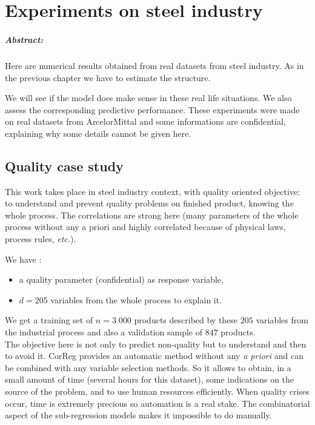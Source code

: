 \documentclass[12pt,a4paper]{report}
\begin{document}
\chapter{Experiments on steel industry} \label{sectionrealcase}
\paragraph{Abstract:} Here are numerical results obtained from real datasets from steel industry. As in the previous chapter we have to estimate the structure. 

We will see if the model does make sense in these real life situations.%
We also assess the corresponding predictive performance. 
These experiments were made on real datasets from ArcelorMittal and some informations are confidential, explaining why some details cannot be given here.%

	\section{Quality case study} \label{sectionexfos}
This work takes place in steel industry context, with quality oriented objective: to understand and prevent quality problems on finished product, knowing the whole process. The correlations are strong here (many parameters of the whole process without any a priori and highly correlated because of physical laws, process rules, {\it etc.}). 
		
We have :
		\begin{itemize}
			\item a quality parameter (confidential) as response variable,
			\item $d=205$ variables from the whole process to explain it.
		\end{itemize}
We get a training set of $n=3\;000$ products described by these $205$ variables from the industrial process and also a validation sample of $847$ products.\\

The objective here is not only to predict non-quality but to understand and then to avoid it. {\sc CorReg} provides an automatic method without any {\it a priori} and can be combined with any variable selection methods. So it allows to obtain, in a small amount of time (several hours for this dataset), some indications on the source of the problem, and to use human resources efficiently. When quality crises occur, time is extremely precious so automation is a real stake. The combinatorial aspect of the sub-regression models makes it impossible to do manually.\\
\end{document}
